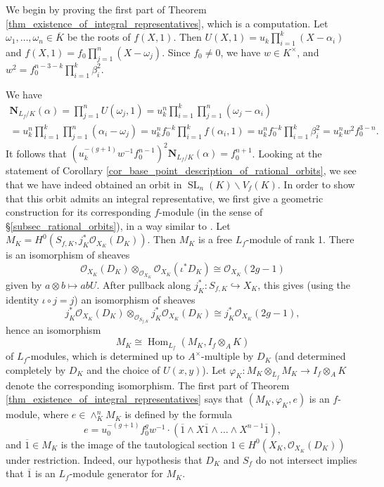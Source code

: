 \documentclass{article} %
\numberwithin{equation}{section}
\DeclareMathOperator{\SL}{SL}
\DeclareMathOperator{\Hom}{Hom}
\newcommand{\cO}{\mathcal{O}}
\begin{document}
We begin by proving the first part of Theorem \ref{thm_existence_of_integral_representatives}, which is a computation. Let $\omega_1, \dots, \omega_n \in \overline{K}$ be the roots of $f(X, 1)$. Then $U(X, 1) = u_k \prod_{i=1}^{k} (X - \alpha_i)$ and $f(X, 1) = f_0 \prod_{j=1}^n (X - \omega_j)$. Since $f_0 \neq 0$, we have $w \in K^\times$, and $w^2 = f_0^{n-3-k} \prod_{i=1}^k \beta_i^2$. 

We have 
\begin{multline*}  \mathbf{N}_{L_f / K}(\alpha) = \prod_{j=1}^n U(\omega_j, 1) = u_k^{n} \prod_{i=1}^{k} \prod_{j=1}^n (\omega_j - \alpha_i) \\
=  u_k^{n} \prod_{i=1}^{k} \prod_{j=1}^n (\alpha_i - \omega_j) = u_k^n f_0^{-k} \prod_{i=1}^{k} f(\alpha_i, 1) = u_k^{n} f_0^{-k} \prod_{i=1}^{k} \beta_i^2 = u_k^n w^2 f_0^{3-n}.
\end{multline*} 
It follows that $(u_k^{-(g+1)} w^{-1} f_0^{n-1})^2 \mathbf{N}_{L_f / K}(\alpha) = f_0^{n+1}$. Looking at the statement of Corollary \ref{cor_base_point_description_of_rational_orbits}, we see that we have indeed obtained an orbit in $\SL_n(K) \backslash V_f(K)$. In order to show that this orbit admits an integral representative, we first give a geometric construction for its corresponding $f$-module (in the sense of \S \ref{subsec_rational_orbits}), in a way similar to \cite{Tho14, lagathorne2024smallheightoddhyperelliptic}. Let $M_K = H^0(S_{f, K}, j_K^\ast \cO_{X_K}(D_K))$. Then $M_K$ is a free $L_f$-module of rank 1. There is an isomorphism of sheaves 
\begin{equation}\label{eqn_isomorphism_of_line_bundles_in_generic_fibre} \cO_{X_K}(D_K) \otimes_{\cO_{X_K}} \cO_{X_K}(\iota^\ast D_K) \cong \cO_{X_K}(2g-1) 
\end{equation}
given by $a \otimes b \mapsto a b U$. After pullback along $j_K^\ast : S_{f, K} \hookrightarrow X_K$, this gives (using the identity $\iota \circ j = j$) an isomorphism of sheaves
\[ j_K^\ast \cO_{X_K}(D_K) \otimes_{\cO_{S_{f, K}}} j_K^\ast \cO_{X_K}(D_K) \cong j_K^\ast \cO_{X_K}(2g-1), \]
hence an isomorphism
\[ M_K \cong \Hom_{L_f}(M_K, I_f \otimes_A K) \]
of $L_f$-modules, which is determined up to $A^\times$-multiple by $D_K$ (and determined completely by $D_K$ and the choice of $U(x, y)$). Let $\varphi_K : M_K \otimes_{L_f} M_K \to I_f \otimes_A K$ denote the corresponding isomorphism. The first part of Theorem \ref{thm_existence_of_integral_representatives} says that $(M_K, \varphi_K, e)$ is an $f$-module, where $e \in \wedge^n_K M_K$ is defined by the formula
\[ e = u_0^{-(g+1)} f_0^{g} w^{-1} \cdot ( \overline{1} \wedge X \overline{1} \wedge \dots \wedge X^{n-1} \overline{1}), \]
and $\overline{1} \in M_K$ is the image of the tautological section $1 \in H^0(X_K, \cO_{X_K}(D_K))$ under restriction. Indeed, our hypothesis that $D_K$ and $S_f$ do not intersect implies that $\overline{1}$ is an $L_f$-module generator for $M_K$.
\end{document}
